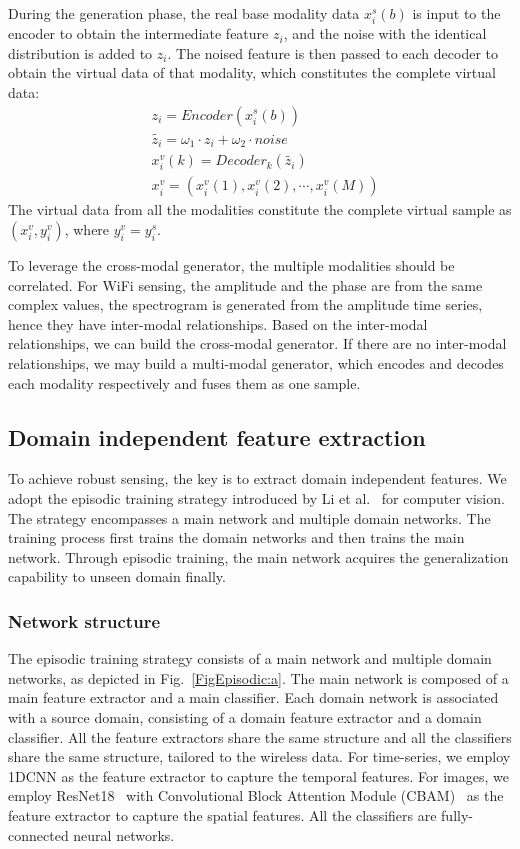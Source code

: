 \documentclass[journal]{IEEEtran}
\begin{document}
During the generation phase, the real base modality data $x_i^s(b)$ is input to the encoder to obtain the intermediate feature $z_i$, and the noise with the identical distribution is added to $z_i$. The noised feature is then passed to each decoder to obtain the virtual data of that modality, which constitutes the complete virtual data:
\begin{equation}
\begin{split}
    & z_i = Encoder(x_i^s(b))	\\
    & \tilde{z_i} = \omega_{1} \cdot z_i + \omega_{2} \cdot noise  \\
    & x_i^v(k) = Decoder_{k}(\tilde{z_i})	\\
		& x_i^v=(x_i^v(1),x_i^v(2),\cdots,x_i^v(M))
\end{split}
\end{equation}
The virtual data from all the modalities constitute the complete virtual sample as $(x_i^v, y_i^{v})$, where $y_{i}^{v} = y_{i}^{s}$.

To leverage the cross-modal generator, the multiple modalities should be correlated. For WiFi sensing, the amplitude and the phase are from the same complex values, the spectrogram is generated from the amplitude time series, hence they have inter-modal relationships. Based on the inter-modal relationships, we can build the cross-modal generator. If there are no inter-modal relationships, we may build a multi-modal generator, which encodes and decodes each modality respectively and fuses them as one sample.  

\subsection{Domain independent feature extraction}
To achieve robust sensing, the key is to extract domain independent features. We adopt the episodic training strategy introduced by Li et al.~\cite{LiD:2019} for computer vision. The strategy encompasses a main network and multiple domain networks. The training process first trains the domain networks and then trains the main network. Through episodic training, the main network acquires the generalization capability to unseen domain finally.

\subsubsection{Network structure}
The episodic training strategy consists of a main network and multiple domain networks, as depicted in Fig.~\ref{FigEpisodic:a}. The main network is composed of a main feature extractor and a main classifier. Each domain network is associated with a source domain, consisting of a domain feature extractor and a domain classifier. All the feature extractors share the same structure and all the classifiers share the same structure, tailored to the wireless data. For time-series, we employ 1DCNN as the feature extractor to capture the temporal features. For images, we employ ResNet18~\cite{HeK:2016} with Convolutional Block Attention Module (CBAM)~\cite{Woo:2018} as the feature extractor to capture the spatial features. All the classifiers are fully-connected neural networks. 
\end{document}
